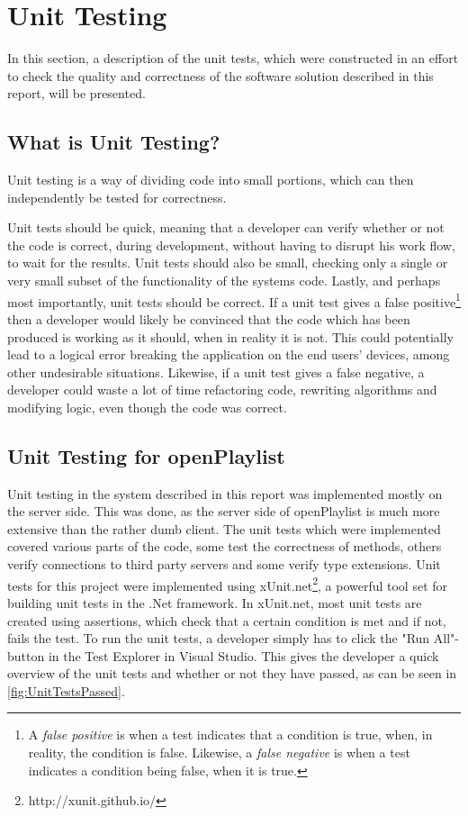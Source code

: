 \section{Unit Testing}
In this section, a description of the unit tests, which were constructed in an effort to check the quality and correctness of the software solution described in this report, will be presented.

\subsection{What is Unit Testing?}
Unit testing is a way of dividing code into small portions, which can then independently be tested for correctness\cite{unittesting}.

Unit tests should be quick, meaning that a developer can verify whether or not the code is correct, during development, without having to disrupt his work flow, to wait for the results. 
Unit tests should also be small, checking only a single or very small subset of the functionality of the systems code. 
Lastly, and perhaps most importantly, unit tests should be correct. If a unit test gives a false positive\footnote{A \emph{false positive} is when a test indicates that a condition is true, when, in reality, the condition is false. Likewise, a \emph{false negative} is when a test indicates a condition being false, when it is true.} then a developer would likely be convinced that the code which has been produced is working as it should, when in reality it is not. This could potentially lead to a logical error breaking the application on the end users' devices, among other undesirable situations. Likewise, if a unit test gives a false negative, a developer could waste a lot of time refactoring code, rewriting algorithms and modifying logic, even though the code was correct.


\subsection{Unit Testing for openPlaylist}
Unit testing in the system described in this report was implemented mostly on the server side. This was done, as the server side of openPlaylist is much more extensive than the rather dumb client.
The unit tests which were implemented covered various parts of the code, some test the correctness of methods, others verify connections to third party servers and some verify type extensions.
Unit tests for this project were implemented using xUnit.net\footnote{http://xunit.github.io/}, a powerful tool set for building unit tests in the .Net framework. In xUnit.net, most unit tests are created using assertions, which check that a certain condition is met and if not, fails the test.
To run the unit tests, a developer simply has to click the "Run All"-button in the Test Explorer in Visual Studio. This gives the developer a quick overview of the unit tests and whether or not they have passed, as can be seen in \cref{fig:UnitTestsPassed}.

